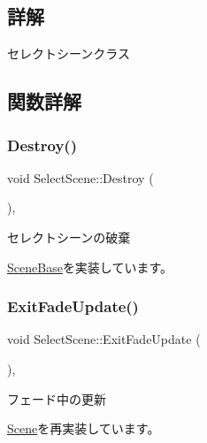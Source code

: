 \subsection{詳解}
セレクトシーンクラス 

\subsection{関数詳解}
\mbox{\label{class_select_scene_a938293516c0e1ae5bb09dbab81bc78d9}} 
\subsubsection{\texorpdfstring{Destroy()}{Destroy()}}
{\footnotesize\ttfamily void Select\+Scene\+::\+Destroy (\begin{DoxyParamCaption}{ }\end{DoxyParamCaption})\hspace{0.3cm}{\ttfamily [final]}, {\ttfamily [virtual]}}



セレクトシーンの破棄 



\mbox{\hyperlink{class_scene_base_a7c5b54020bc519b4dadfe9770d6b27f7}{Scene\+Base}}を実装しています。

\mbox{\label{class_select_scene_a546190bc143f6d7a3055935f97b55596}} 
\subsubsection{\texorpdfstring{Exit\+Fade\+Update()}{ExitFadeUpdate()}}
{\footnotesize\ttfamily void Select\+Scene\+::\+Exit\+Fade\+Update (\begin{DoxyParamCaption}{ }\end{DoxyParamCaption})\hspace{0.3cm}{\ttfamily [final]}, {\ttfamily [virtual]}}



フェード中の更新 



\mbox{\hyperlink{class_scene_ad19a449c6ed452823dae14183689570c}{Scene}}を再実装しています。


